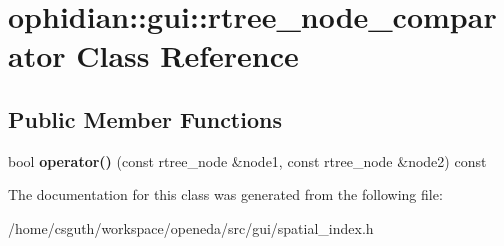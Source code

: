 \hypertarget{classophidian_1_1gui_1_1rtree__node__comparator}{\section{ophidian\-:\-:gui\-:\-:rtree\-\_\-node\-\_\-comparator Class Reference}
\label{classophidian_1_1gui_1_1rtree__node__comparator}
}
\subsection*{Public Member Functions}
\begin{DoxyCompactItemize}
\item 
\hypertarget{classophidian_1_1gui_1_1rtree__node__comparator_a58c5266fb75fb04f7184ff2dbcd4da03}{bool {\bfseries operator()} (const rtree\-\_\-node \&node1, const rtree\-\_\-node \&node2) const }\label{classophidian_1_1gui_1_1rtree__node__comparator_a58c5266fb75fb04f7184ff2dbcd4da03}

\end{DoxyCompactItemize}


The documentation for this class was generated from the following file\-:\begin{DoxyCompactItemize}
\item 
/home/csguth/workspace/openeda/src/gui/spatial\-\_\-index.\-h\end{DoxyCompactItemize}

